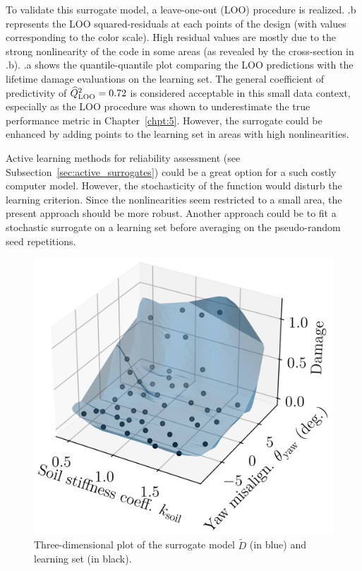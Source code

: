 To validate this surrogate model, a leave-one-out (LOO) procedure is realized. 
.b represents the LOO squared-residuals at each points of the design (with values corresponding to the color scale). 
High residual values are mostly due to the strong nonlinearity of the code in some areas (as revealed by the cross-section in .b).
.a shows the quantile-quantile plot comparing the LOO predictions with the lifetime damage evaluations on the learning set. 
The general coefficient of predictivity of $\widehat{Q}^2_{\mathrm{LOO}}=0.72$ is considered acceptable in this small data context, especially as the LOO procedure was shown to underestimate the true performance metric in Chapter~\ref{chpt:5}. 
However, the surrogate could be enhanced by adding points to the learning set in areas with high nonlinearities.

\medskip
\begin{remark}
    Active learning methods for reliability assessment (see Subsection~\ref{sec:active_surrogates}) could be a great option for a such costly computer model. 
    However, the stochasticity of the function would disturb the learning criterion. 
    Since the nonlinearities seem restricted to a small area, the present approach should be more robust. 
    Another approach could be to fit a stochastic surrogate \citep{binois_2019_replication,baker_2022_stochastic_surrogates_review,zhu_2023_thesis} on a learning set before averaging on the pseudo-random seed repetitions.  
\end{remark}
\medskip

\begin{figure}[h!]
    \centering
    \includegraphics[width=0.45\linewidth]{./part3/figures/OWT/3D_surrogate.png}
    \caption{Three-dimensional plot of the surrogate model $\widetilde{D}$ (in blue) and learning set (in black).}
    \label{fig:3d_owt_surrogate}
\end{figure}

